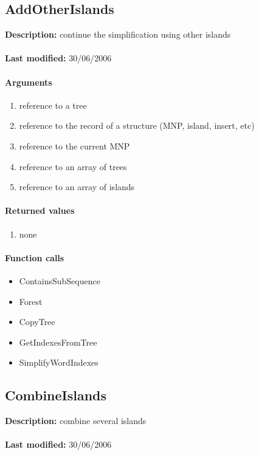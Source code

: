 \subsection{AddOtherIslands}
\textbf{Description:} continue the simplification using other islands\\
\\\textbf{Last modified:} 30/06/2006

\paragraph{Arguments}
\begin{enumerate}
\item reference to a tree
\item reference to the record of a structure (MNP, island, insert, etc)
\item reference to the current MNP
\item reference to an array of trees
\item reference to an array of islands
\end{enumerate}

\paragraph{Returned values}
\begin{enumerate}
\item none
\end{enumerate}

\paragraph{Function calls}
\begin{itemize}
\item ContainsSubSequence
\item Forest
\item CopyTree
\item GetIndexesFromTree
\item SimplifyWordIndexes
\end{itemize}

\subsection{CombineIslands}
\textbf{Description:} combine several islands\\
\\\textbf{Last modified:} 30/06/2006

